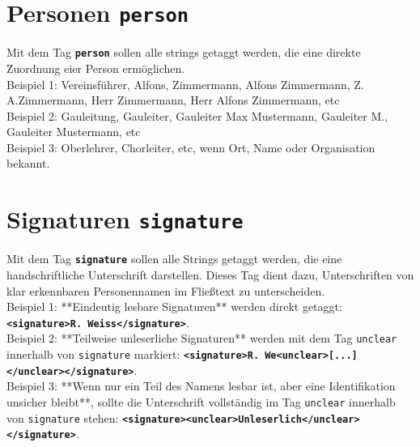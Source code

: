 \documentclass{article}
\begin{document}
\section*{Personen \texttt{\texttt{\textbf{{\colorbox{person}{person}}}}}}

Mit dem Tag \texttt{\texttt{\texttt{\textbf{{\colorbox{person}{person}}}}}} sollen alle strings getaggt werden, die eine direkte Zuordnung eier Person ermöglichen. \\

\noindent{} Beispiel 1: Vereinsführer, Alfons, Zimmermann, Alfons Zimmermann, Z. A.Zimmermann, Herr Zimmermann, Herr Alfons Zimmermann, etc \\
 Beispiel 2: Gauleitung, Gauleiter, Gauleiter Max Mustermann, Gauleiter M., Gauleiter Mustermann, etc\\
 Beispiel 3: Oberlehrer, Chorleiter, etc, wenn Ort, Name oder Organisation bekannt. \\

\section*{Signaturen \texttt{\texttt{\textbf{{\colorbox{signature}{signature}}}}}}

Mit dem Tag \texttt{\texttt{\texttt{\textbf{{\colorbox{signature}{signature}}}}}} sollen alle Strings getaggt werden, die eine handschriftliche Unterschrift darstellen. Dieses Tag dient dazu, Unterschriften von klar erkennbaren Personennamen im Fließtext zu unterscheiden. \\

\noindent{} Beispiel 1: **Eindeutig lesbare Signaturen** werden direkt getaggt:  
\texttt{\textbf{\textless signature\textgreater R. Weiss\textless /signature\textgreater}}.\\  

 Beispiel 2: **Teilweise unleserliche Signaturen** werden mit dem Tag \texttt{unclear} innerhalb von \texttt{signature} markiert:  
\texttt{\textbf{\textless signature\textgreater R. We\textless unclear\textgreater [...]\textless /unclear\textgreater\textless /signature\textgreater}}.\\  

 Beispiel 3: **Wenn nur ein Teil des Namens lesbar ist, aber eine Identifikation unsicher bleibt**, sollte die Unterschrift vollständig im Tag \texttt{unclear} innerhalb von \texttt{signature} stehen:  
\texttt{\textbf{\textless signature\textgreater \textless unclear\textgreater Unleserlich\textless /unclear\textgreater \textless /signature\textgreater}}.\\  
\end{document}
